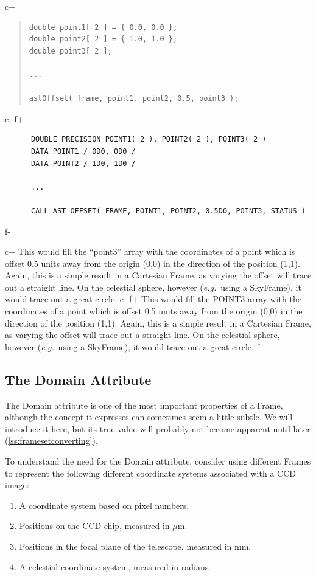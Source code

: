 \documentclass[twoside,11pt]{article}
\newcommand{\secref}[1]{\S\ref{#1}}
\renewcommand{\secref}[1]{\ref{#1}}
\begin{document}
c+
\begin{quote}
\small
\begin{verbatim}
double point1[ 2 ] = { 0.0, 0.0 };
double point2[ 2 ] = { 1.0, 1.0 };
double point3[ 2 ];

...

astOffset( frame, point1. point2, 0.5, point3 );
\end{verbatim}
\normalsize
\end{quote}
c-
f+
\small
\begin{verbatim}
      DOUBLE PRECISION POINT1( 2 ), POINT2( 2 ), POINT3( 2 )
      DATA POINT1 / 0D0, 0D0 /
      DATA POINT2 / 1D0, 1D0 /

      ...

      CALL AST_OFFSET( FRAME, POINT1, POINT2, 0.5D0, POINT3, STATUS )
\end{verbatim}
\normalsize
f-

c+
This would fill the ``point3'' array with the coordinates of a point
which is offset 0.5 units away from the origin (0,0) in the direction
of the position (1,1). Again, this is a simple result in a Cartesian
Frame, as varying the offset will trace out a straight line. On the
celestial sphere, however ({\em{e.g.}}\ using a SkyFrame), it would
trace out a great circle.
c-
f+
This would fill the POINT3 array with the coordinates of a point which
is offset 0.5 units away from the origin (0,0) in the direction of the
position (1,1). Again, this is a simple result in a Cartesian Frame,
as varying the offset will trace out a straight line. On the celestial
sphere, however ({\em{e.g.}}\ using a SkyFrame), it would trace out a
great circle.
f-

\subsection{\label{ss:framedomains}The Domain Attribute}

The Domain attribute is one of the most important properties of a
Frame, although the concept it expresses can sometimes seem a little
subtle.  We will introduce it here, but its true value will probably
not become apparent until later (\secref{ss:framesetconverting}).

To understand the need for the Domain attribute, consider using
different Frames to represent the following different coordinate
systems associated with a CCD image:

\begin{enumerate}
\item A coordinate system based on pixel numbers.

\item Positions on the CCD chip, measured in $\mu$m.

\item Positions in the focal plane of the telescope, measured in mm.

\item A celestial coordinate system, measured in radians.
\end{enumerate}
\end{document}
